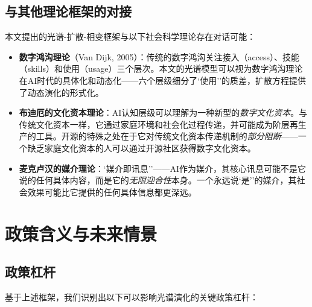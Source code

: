 \documentclass[12pt,a4paper]{ctexart}
\begin{document}
\subsection{与其他理论框架的对接}

本文提出的光谱-扩散-相变框架与以下社会科学理论存在对话可能：

\begin{itemize}
\item \textbf{数字鸿沟理论}（Van Dijk, 2005）：传统的数字鸿沟关注接入（access）、技能（skills）和使用（usage）三个层次。本文的光谱模型可以视为数字鸿沟理论在AI时代的具体化和动态化——六个层级细分了`使用''的质差，扩散方程提供了动态演化的形式化。
\item \textbf{布迪厄的文化资本理论}：AI认知层级可以理解为一种新型的\emph{数字文化资本}。与传统文化资本一样，它通过家庭环境和社会化过程传递，并可能成为阶层再生产的工具。开源的特殊之处在于它对传统文化资本传递机制的\textit{部分阻断}——一个缺乏家庭文化资本的人可以通过开源社区获得数字文化资本。
\item \textbf{麦克卢汉的媒介理论}：`媒介即讯息''——AI作为媒介，其核心讯息可能不是它说的任何具体内容，而是它的\textit{无限迎合性}本身。一个永远说`是''的媒介，其社会效果可能比它提供的任何具体信息都更深远。
\end{itemize}

\section{政策含义与未来情景}

\subsection{政策杠杆}

基于上述框架，我们识别出以下可以影响光谱演化的关键政策杠杆：
\end{document}

